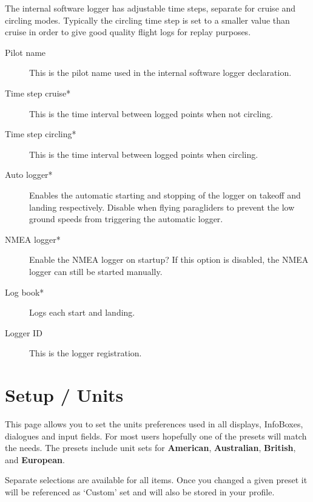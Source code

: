 The internal software logger has adjustable time steps, separate for
cruise and circling modes.  
Typically the circling time step is set to a smaller value
than cruise in order to give good quality flight logs for replay
purposes.

\begin{description}
\item[Pilot name]  This is the pilot name used in the internal software logger 
  declaration.
\item[Time step cruise*]  This is the time interval between logged points when 
  not circling. 
\item[Time step circling*]  This is the time interval between logged points when 
  circling. 
\item[Auto logger*]  Enables the automatic starting and stopping of the logger
  on takeoff and landing respectively. Disable when flying paragliders to prevent 
  the low ground speeds from triggering the automatic logger.
\item[NMEA logger*]  Enable the NMEA logger on startup? If this option is disabled, 
  the NMEA logger can still be started manually.
\item[Log book*]  Logs each start and landing.
\item[Logger ID]  This is the logger registration.
\end{description}



\section{Setup / Units}

This page allows you to set the units preferences used in all
displays, InfoBoxes, dialogues and input fields.  
For most users hopefully one of the presets will match the needs.  The presets 
include unit sets for {\bf American}, {\bf Australian}, {\bf British}, 
and {\bf European}.

Separate selections are available for all items. Once you changed a given preset it 
will be referenced as `Custom' set and will also be stored in your profile.

